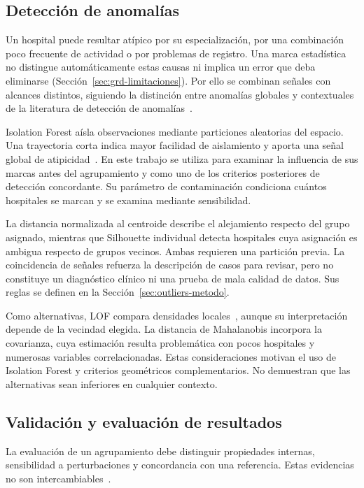 \subsection{Detección de anomalías}
\label{sec:anomalias}

Un hospital puede resultar atípico por su especialización, por una combinación
poco frecuente de actividad o por problemas de registro. Una marca estadística
no distingue automáticamente estas causas ni implica un error que deba
eliminarse (Sección~\ref{sec:grd-limitaciones}). Por ello se combinan señales
con alcances distintos, siguiendo la distinción entre anomalías globales y
contextuales de la literatura de detección de anomalías~\citep{Chandola2009}.

Isolation Forest aísla observaciones mediante particiones aleatorias del
espacio. Una trayectoria corta indica mayor facilidad de aislamiento y aporta
una señal global de atipicidad~\citep{Liu2008}. En este trabajo se utiliza
para examinar la influencia de sus marcas antes del agrupamiento y como uno
de los criterios posteriores de detección concordante. Su parámetro de
contaminación condiciona cuántos hospitales se marcan y se examina mediante
sensibilidad.

La distancia normalizada al centroide describe el alejamiento respecto del
grupo asignado, mientras que Silhouette individual detecta hospitales cuya
asignación es ambigua respecto de grupos vecinos. Ambas requieren una
partición previa. La coincidencia de señales refuerza la descripción de casos
para revisar, pero no constituye un diagnóstico clínico ni una prueba de mala
calidad de datos. Sus reglas se definen en la
Sección~\ref{sec:outliers-metodo}.

Como alternativas, LOF compara densidades locales~\citep{Breunig2000},
aunque su interpretación depende de la vecindad elegida. La distancia de
Mahalanobis incorpora la covarianza, cuya estimación resulta problemática con
pocos hospitales y numerosas variables correlacionadas. Estas consideraciones
motivan el uso de Isolation Forest y criterios geométricos complementarios.
No demuestran que las alternativas sean inferiores en cualquier contexto.

\subsection{Validación y evaluación de resultados}
\label{sec:validacion}

La evaluación de un agrupamiento debe distinguir propiedades internas,
sensibilidad a perturbaciones y concordancia con una referencia. Estas evidencias
no son intercambiables~\citep{Halkidi2001}.

